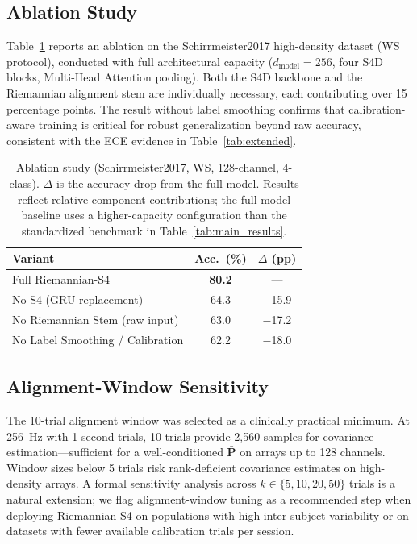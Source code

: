 \documentclass[11pt,a4paper]{article}
\begin{document}
\subsection{Ablation Study}

Table~\ref{tab:ablation} reports an ablation on the Schirrmeister2017
high-density dataset (WS protocol), conducted with full architectural capacity
($d_\text{model}=256$, four S4D blocks, Multi-Head Attention pooling).
Both the S4D backbone and the Riemannian alignment stem are individually
necessary, each contributing over 15 percentage points.
The result without label smoothing confirms that calibration-aware training is
critical for robust generalization beyond raw accuracy, consistent with the
ECE evidence in Table~\ref{tab:extended}.

\begin{table}[ht]
\centering
\small
\caption{Ablation study (Schirrmeister2017, WS, 128-channel, 4-class).
$\Delta$ is the accuracy drop from the full model.
Results reflect relative component contributions; the full-model baseline
uses a higher-capacity configuration than the standardized benchmark in
Table~\ref{tab:main_results}.}
\label{tab:ablation}
\begin{tabular}{@{}lcc@{}}
\toprule
\textbf{Variant} & \textbf{Acc.\ (\%)} & \textbf{$\Delta$ (pp)} \\
\midrule
Full Riemannian-S4 & \textbf{80.2} & --- \\
No S4 (GRU replacement) & 64.3 & $-$15.9 \\
No Riemannian Stem (raw input) & 63.0 & $-$17.2 \\
No Label Smoothing / Calibration & 62.2 & $-$18.0 \\
\bottomrule
\end{tabular}
\end{table}

\subsection{Alignment-Window Sensitivity}

The 10-trial alignment window was selected as a clinically practical minimum.
At 256~Hz with 1-second trials, 10 trials provide 2,560 samples for covariance
estimation---sufficient for a well-conditioned $\bar{\mathbf{P}}$ on arrays up
to 128 channels.
Window sizes below 5 trials risk rank-deficient covariance estimates on
high-density arrays.
A formal sensitivity analysis across $k \in \{5, 10, 20, 50\}$ trials is a
natural extension; we flag alignment-window tuning as a recommended step when
deploying Riemannian-S4 on populations with high inter-subject variability
or on datasets with fewer available calibration trials per session.
\end{document}
